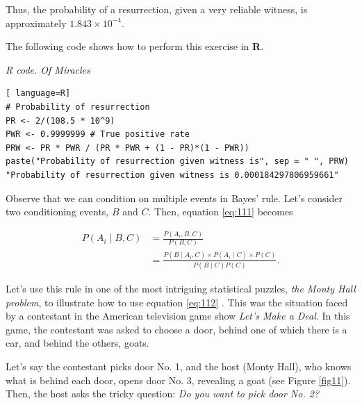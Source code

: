 Thus, the probability of a resurrection, given a very reliable witness, is approximately \( 1.843 \times 10^{-4} \).

The following code shows how to perform this exercise in \textbf{R}.

\begin{tcolorbox}[enhanced,width=4.67in,center upper,
	fontupper=\large\bfseries,drop shadow southwest,sharp corners]
\textit{R code. Of Miracles}
\begin{VF}
\begin{lstlisting}[ language=R]
# Probability of resurrection
PR <- 2/(108.5 * 10^9) 
PWR <- 0.9999999 # True positive rate
PRW <- PR * PWR / (PR * PWR + (1 - PR)*(1 - PWR)) 
paste("Probability of resurrection given witness is", sep = " ", PRW)
"Probability of resurrection given witness is 0.000184297806959661"
\end{lstlisting}
\end{VF}
\end{tcolorbox}

Observe that we can condition on multiple events in Bayes' rule. Let's consider two conditioning events, \( B \) and \( C \). Then, equation \ref{eq:111} becomes

\begin{align}
	P(A_i\mid B,C)&=\frac{P(A_i,B,C)}{P(B,C)}\nonumber\\
	&=\frac{P(B\mid A_i,C) \times P(A_i\mid C) \times P(C)}{P(B\mid C)P(C)}.
	\label{eq:112}
\end{align}

Let's use this rule in one of the most intriguing statistical puzzles, \textit{the Monty Hall problem}, to illustrate how to use equation \ref{eq:112} \cite{selvin1975problem,Dawid2016}. This was the situation faced by a contestant in the American television game show \textit{Let's Make a Deal}. In this game, the contestant was asked to choose a door, behind one of which there is a car, and behind the others, goats. 

Let's say the contestant picks door No. 1, and the host (Monty Hall), who knows what is behind each door, opens door No. 3, revealing a goat (see Figure \ref{fig11}). Then, the host asks the tricky question: \textit{Do you want to pick door No. 2?}



